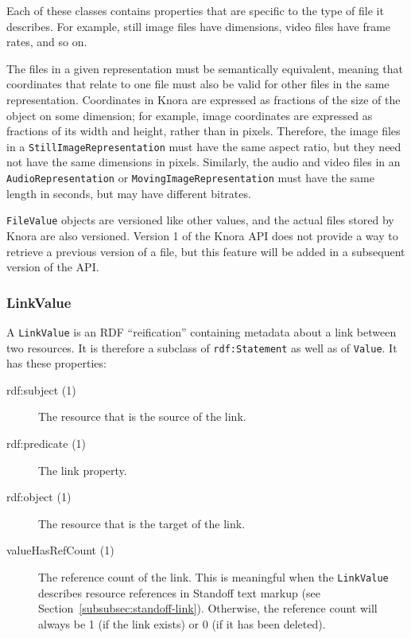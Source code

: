 \documentclass[12pt, a4paper]{article}
\begin{document}
Each of these classes contains properties that are specific to the type of file it describes. For example, still image files have dimensions, video files have frame rates, and so on.

The files in a given representation must be semantically equivalent, meaning that coordinates that relate to one file must also be valid for other files in the same representation. Coordinates in Knora are expressed as fractions of the size of the object on some dimension; for example, image coordinates are expressed as fractions of its width and height, rather than in pixels. Therefore, the image files in a \texttt{StillImageRepresentation} must have the same aspect ratio, but they need not have the same dimensions in pixels. Similarly, the audio and video files in an \texttt{AudioRepresentation} or \texttt{MovingImageRepresentation} must have the same length in seconds, but may have different bitrates.

\texttt{FileValue} objects are versioned like other values, and the actual files stored by Knora are also versioned. Version 1 of the Knora API does not provide a way to retrieve a previous version of a file, but this feature will be added in a subsequent version of the API.

\subsubsection{LinkValue}

\label{subsubsec:linkvalue}

A \texttt{LinkValue} is an RDF \enquote{reification} containing metadata about a link between two resources. It is therefore a subclass of \texttt{rdf:Statement} as well as of \texttt{Value}. It has these properties:

\begin{description}
	\item[rdf:subject (1)] The resource that is the source of the link.
	\item[rdf:predicate (1)] The link property.
	\item[rdf:object (1)] The resource that is the target of the link.
	\item[valueHasRefCount (1)] The reference count of the link. This is meaningful when the \texttt{LinkValue} describes resource references in Standoff text markup (see Section~\ref{subsubsec:standoff-link}). Otherwise, the reference count will always be 1 (if the link exists) or 0 (if it has been deleted).
\end{description}
\end{document}
